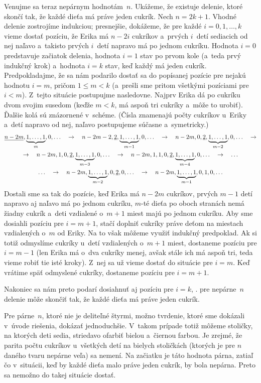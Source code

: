 {Venujme sa teraz nepárnym hodnotám~$n$. Ukážeme, že existuje delenie, ktoré skončí tak, že každé dieťa má práve jeden cukrík. Nech $n=2k+1$. Vhodné delenie zostrojíme indukciou; presnejšie, dokážeme, že pre každé $i=0,1,\dots,k$ vieme dostať pozíciu, že Erika má $n-2i$ cukríkov a~prvých $i$~detí sediacich od nej naľavo a~takisto prvých $i$~detí napravo má po jednom cukríku. Hodnota $i=0$ predstavuje začiatok delenia, hodnota $i=1$ stav po prvom kole (a~teda prvý indukčný krok) a~hodnota $i=k$ stav, keď každý má jeden cukrík. Predpokladajme, že sa nám podarilo dostať sa do popísanej pozície pre nejakú hodnotu $i=m$, pričom $1\le m<k$ (a~prešli sme pritom všetkými pozíciami pre $i<m$). Z~tejto situácie postupujme nasledovne. Najprv Erika dá po cukríku dvom svojim susedom (keďže $m<k$, má aspoň tri cukríky a~môže to urobiť). Ďalšie kolá sú znázornené v~schéme. (Čísla znamenajú počty cukríkov u~Eriky a~detí napravo od nej, naľavo postupujeme súčasne a~symetricky.)
$$
\gathered
  \underline{n-2m},\underbrace{1,\dots,1}_{m},0,\dots\quad\rightarrow\quad
  n-2m-2,\underline{2},\underbrace{1,\dots,1}_{m-1},0,\dots\quad\rightarrow\quad
  n-2m,0,\underline{2},\underbrace{1,\dots,1}_{m-2},0,\dots\quad\rightarrow\\
  \rightarrow\quad 
  n-2m,1,0,\underline{2},\underbrace{1,\dots,1}_{m-3},0,\dots\quad\rightarrow\quad
  n-2m,1,1,0,\underline{2},\underbrace{1,\dots,1}_{m-4},0,\dots\quad\rightarrow\quad\dots\\
  \dots\quad\rightarrow\quad 
  n-2m,\underbrace{1,\dots,1}_{m-2},0,\underline{2},0,\dots\quad\rightarrow\quad
  n-2m,\underbrace{1,\dots,1}_{m-1},0,1,0,\dots
\endgathered
$$  
Dostali sme sa tak do pozície, keď Erika má $n-2m$ cukríkov, prvých $m-1$ detí napravo aj naľavo má po jednom cukríku, $m$-té dieťa po oboch stranách nemá žiadny cukrík a~deti vzdialené o~$m+1$ miest majú po jednom cukríku. Aby sme dosiahli pozíciu pre $i=m+1$, stačí doplniť cukríky práve deťom na miestach vzdialených o~$m$ od Eriky. Na to však môžeme využiť indukčný predpoklad. Ak si totiž odmyslíme cukríky u~detí vzdialených o~$m+1$ miest, dostaneme pozíciu pre $i=m-1$ (len Erika má o~dva cukríky menej, avšak stále ich má aspoň tri, teda vieme robiť tie isté kroky). Z~nej sa už vieme dostať do situácie pre $i=m$. Keď vrátime späť odmyslené cukríky, dostaneme pozíciu pre $i=m+1$.

Nakoniec sa nám preto podarí dosiahnuť aj pozíciu pre $i=k$, \tj. pre nepárne~$n$ delenie môže skončiť tak, že každé dieťa má práve jeden cukrík.

\poznamky
Pre párne~$n$, ktoré nie je deliteľné štyrmi, možno tvrdenie, ktoré sme dokázali v~úvode riešenia, dokázať jednoduchšie. V~takom prípade totiž môžeme stoličky, na ktorých deti sedia, striedavo ofarbiť bielou a~čiernou farbou. Je zrejmé, že parita počtu cukríkov u~všetkých detí na bielych stoličkách (ktorých je pre $n$ daného tvaru nepárne veľa) sa nemení. Na začiatku je táto hodnota párna, zatiaľ čo v~situácii, keď by každé dieťa malo práve jeden cukrík, by bola nepárna. Preto sa nemožno do takej situácie dostať.

}

